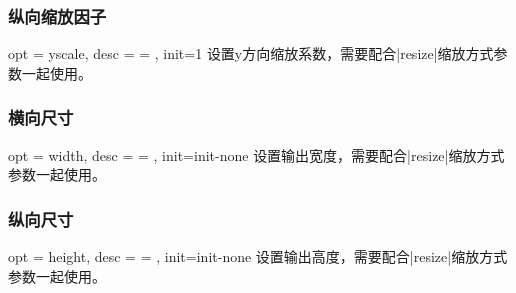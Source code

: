 \documentclass[full]{l3doc}
\begin{document}
\begin{documentation}
\begin{SideBySideExample}[frame=single,numbers=left,
                xrightmargin=.48\linewidth,gobble=2]
  \centering
  \cchessboard[resize/type=real,
              resize/xscale=0.5]
\end{SideBySideExample}


\bigskip

\subsubsection{纵向缩放因子}

\begin{option}{ opt = yscale, desc = {= }, init=1 }
  设置y方向缩放系数，需要配合|resize|缩放方式参数一起使用。
\end{option}

\begin{SideBySideExample}[frame=single,numbers=left,
                xrightmargin=.70\linewidth,gobble=2]
  \centering
  \cchessboard[%
    resize/type=real,
    resize/yscale=0.5]
\end{SideBySideExample}

\bigskip

\subsubsection{横向尺寸}

\begin{option}{ opt = width, desc = {= }, init=init-none }
  设置输出宽度，需要配合|resize|缩放方式参数一起使用。
\end{option}

\begin{SideBySideExample}[frame=single,numbers=left,
                xrightmargin=.65\linewidth,gobble=2]
  \centering
  \cchessboard[%
    resize/type=real,
    resize/width=7cm]
\end{SideBySideExample}

\bigskip

\subsubsection{纵向尺寸}

\begin{option}{ opt = height, desc = {= }, init=init-none }
  设置输出高度，需要配合|resize|缩放方式参数一起使用。
\end{option}

\begin{SideBySideExample}[frame=single,numbers=left,
                xrightmargin=.65\linewidth,gobble=2]
  \centering
  \cchessboard[%
    resize/type=real,
    resize/height=6cm]
\end{SideBySideExample}


\end{documentation}
\end{document}
